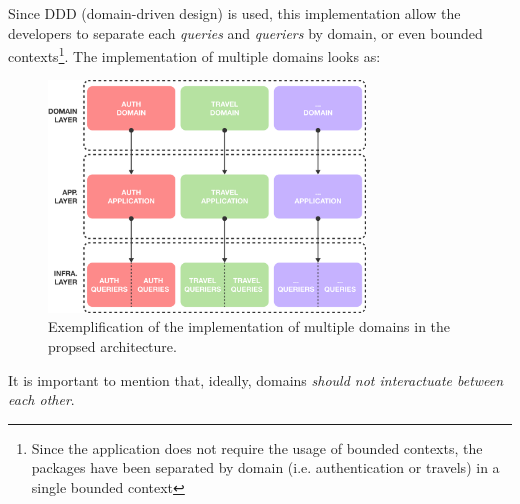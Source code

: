 \documentclass[../design.tex]{subfiles}
\begin{document}
Since DDD (domain-driven design) is used, this implementation allow the
developers to separate each \emph{queries} and \emph{queriers} by domain, or
even bounded contexts\footnote{Since the application does not require the usage
	of bounded contexts, the packages have been separated by domain (i.e.
	authentication or travels) in a single bounded context}. The implementation of
multiple domains looks as:
\begin{figure}[H]
	\centering
	\includegraphics[width=0.75\textwidth]{./assets/core-multi-domain.png}
	\caption{Exemplification of the implementation of multiple domains in the
		propsed architecture.}
\end{figure}
It is important to mention that, ideally, domains \emph{should not interactuate
	between each other}.
\end{document}
